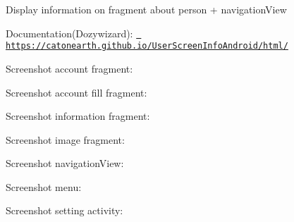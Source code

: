 Display information on fragment about person + navigation\+View

Documentation(\+Dozywizard)\+: \href{https://catonearth.github.io/UserScreenInfoAndroid/html/}{\texttt{ https\+://catonearth.\+github.\+io/\+User\+Screen\+Info\+Android/html/}}

Screenshot account fragment\+: ~\newline
 

 

Screenshot account fill fragment\+: 

 

Screenshot information fragment\+: 

 

Screenshot image fragment\+: 

 

Screenshot navigation\+View\+: 

 

Screenshot menu\+: 

 

Screenshot setting activity\+: 

 